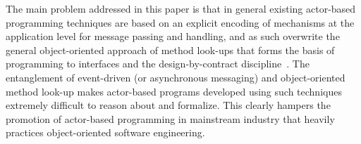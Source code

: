 % 
% 

The main problem addressed in this paper is that in general existing actor-based programming techniques
are based on an explicit encoding of mechanisms at the application level for message passing and handling, 
and as such overwrite the general object-oriented approach of method look-ups that 
forms the basis of programming to interfaces and the design-by-contract discipline~\cite{meyer:design}.
The entanglement of event-driven (or asynchronous messaging) and object-oriented method look-up 
makes  actor-based programs developed using such techniques extremely difficult to  reason about and formalize.
This clearly hampers the promotion of actor-based programming in mainstream industry that heavily practices object-oriented software engineering.

